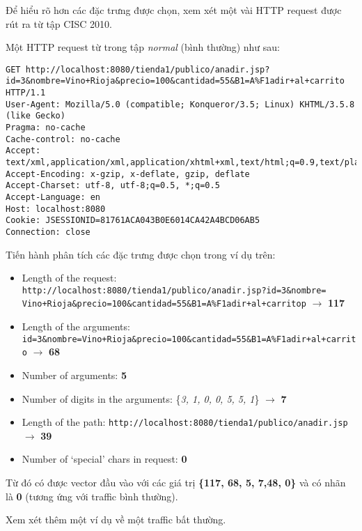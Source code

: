 \documentclass[../main-report.tex]{subfiles}
\begin{document}
Để hiểu rõ hơn các đặc trưng được chọn, xem xét một vài HTTP request được rút ra từ tập CISC 2010.

\begin{example}
Một HTTP request từ trong tập \emph{normal} (bình thường) như sau:

\begin{lstlisting}
GET http://localhost:8080/tienda1/publico/anadir.jsp?id=3&nombre=Vino+Rioja&precio=100&cantidad=55&B1=A%F1adir+al+carrito HTTP/1.1
User-Agent: Mozilla/5.0 (compatible; Konqueror/3.5; Linux) KHTML/3.5.8 (like Gecko)
Pragma: no-cache
Cache-control: no-cache
Accept: text/xml,application/xml,application/xhtml+xml,text/html;q=0.9,text/plain;q=0.8,image/png,*/*;q=0.5
Accept-Encoding: x-gzip, x-deflate, gzip, deflate
Accept-Charset: utf-8, utf-8;q=0.5, *;q=0.5
Accept-Language: en
Host: localhost:8080
Cookie: JSESSIONID=81761ACA043B0E6014CA42A4BCD06AB5
Connection: close
\end{lstlisting}
\end{example} 

Tiến hành phân tích các đặc trưng được chọn trong ví dụ trên:

\begin{itemize}
\item Length of the request: \lstinline{http://localhost:8080/tienda1/publico/anadir.jsp?id=3&nombre= Vino+Rioja&precio=100&cantidad=55&B1=A%F1adir+al+carritop}{} $\to$ \textbf{117}
\item Length of the arguments: \lstinline{id=3&nombre=Vino+Rioja&precio=100&cantidad=55&B1=A%F1adir+al+carrito}{} $\to$ \textbf{68}
\item Number of arguments: \textbf{5}
\item Number of digits in the arguments: \{\emph{3, 1, 0, 0, 5, 5, 1}\} $\to$ \textbf{7}
\item Length of the path: \lstinline{http://localhost:8080/tienda1/publico/anadir.jsp} $\to$ \textbf{39}
\item Number of `special' chars in request: \textbf{0}
\end{itemize}

Từ đó có được vector đầu vào với các giá trị \textbf{\{117, 68, 5, 7,48, 0\}} và có nhãn là \textbf{0} (tương ứng với traffic bình thường).

Xem xét thêm một ví dụ về một traffic bất thường.
\end{document}
